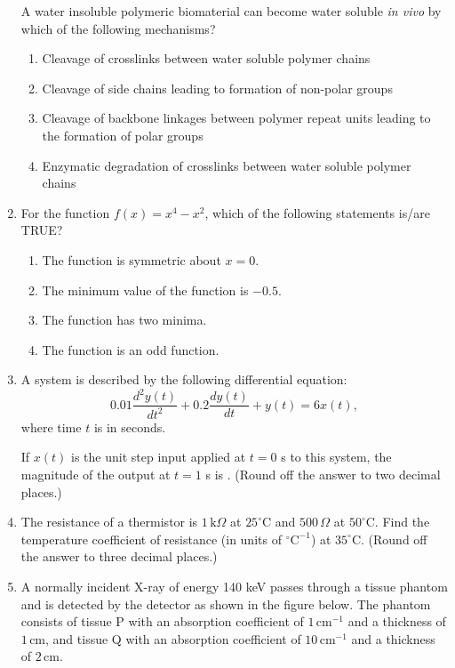 \documentclass[journal]{IEEEtran}
\begin{document}
\begin{enumerate}
A water insoluble polymeric biomaterial can become water soluble \textit{in vivo} by which of the following mechanisms?

\begin{enumerate}[label=(\Alph*)]
    \item Cleavage of crosslinks between water soluble polymer chains
    \item Cleavage of side chains leading to formation of non-polar groups
    \item Cleavage of backbone linkages between polymer repeat units leading to the formation of polar groups
    \item Enzymatic degradation of crosslinks between water soluble polymer chains
\end{enumerate}
\hfill{}

\item 
For the function \( f(x) = x^4 - x^2 \), which of the following statements is/are TRUE?

\begin{enumerate}[label=(\Alph*)]
    \item The function is symmetric about \( x = 0 \).
    \item The minimum value of the function is \( -0.5 \).
    \item The function has two minima.
    \item The function is an odd function.
\end{enumerate}
\hfill{}

\item 
A system is described by the following differential equation:
\[
0.01 \frac{d^2 y(t)}{dt^2} + 0.2 \frac{dy(t)}{dt} + y(t) = 6x(t),
\]
where time \( t \) is in seconds.

If \( x(t) \) is the unit step input applied at \( t = 0 \) s to this system, the magnitude of the output at \( t = 1 \) s is \underline{\hspace{3cm}}. 
(Round off the answer to two decimal places.)
\hfill{}

\item  
The resistance of a thermistor is $1 \, \text{k}\Omega$ at $25^{\circ}\text{C}$ and $500 \, \Omega$ at $50^{\circ}\text{C}$. Find the temperature coefficient of resistance (in units of $^{\circ}\text{C}^{-1}$) at $35^{\circ}\text{C}$. (Round off the answer to three decimal places.)
\hfill{}

\item 
A normally incident X-ray of energy 140 keV passes through a tissue phantom and is detected by the detector as shown in the figure below. The phantom consists of tissue P with an absorption coefficient of \( 1\, \text{cm}^{-1} \) and a thickness of \( 1\, \text{cm} \), and tissue Q with an absorption coefficient of \( 10\, \text{cm}^{-1} \) and a thickness of \( 2\, \text{cm} \).


\end{enumerate}
\end{document}
